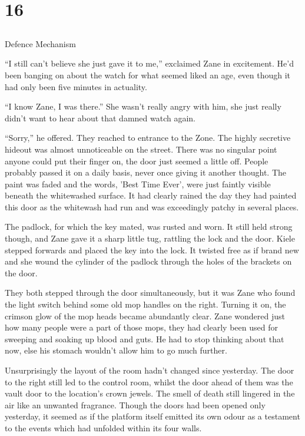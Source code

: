 \chapter{16}
\section{}
Defence Mechanism  

``I still can't believe she just gave it to me,'' exclaimed Zane in excitement.  He'd been banging on about the watch for what seemed liked an age, even though it had only been five minutes in actuality.  

``I know Zane, I was there.'' She wasn't really angry with him, she just really didn't want to hear about that damned watch again.  

``Sorry,'' he offered.  They reached to entrance to the Zone.  The highly secretive hideout was almost unnoticeable on the street.  There was no singular point anyone could put their finger on, the door just seemed a little off.  People probably passed it on a daily basis, never once giving it another thought.  The paint was faded and the words, 'Best Time Ever', were just faintly visible beneath the whitewashed surface.  It had clearly rained the day they had painted this door as the whitewash had run and was exceedingly patchy in several places.

The padlock, for which the key mated, was rusted and worn.  It still held strong though, and Zane gave it a sharp little tug, rattling the lock and the door.  Kiele stepped forwards and placed the key into the lock.  It twisted free as if brand new and she wound the cylinder of the padlock through the holes of the brackets on the door.

They both stepped through the door simultaneously, but it was Zane who found the light switch behind some old mop handles on the right.  Turning it on, the crimson glow of the mop heads became abundantly clear.  Zane wondered just how many people were a part of those mops, they had clearly been used for sweeping and soaking up blood and guts.  He had to stop thinking about that now, else his stomach wouldn't allow him to go much further.

Unsurprisingly the layout of the room hadn't changed since yesterday.  The door to the right still led to the control room, whilst the door ahead of them was the vault door to the location's crown jewels.  The smell of death still lingered in the air like an unwanted fragrance.  Though the doors had been opened only yesterday, it seemed as if the platform itself emitted its own odour as a testament to the events which had unfolded within its four walls.

